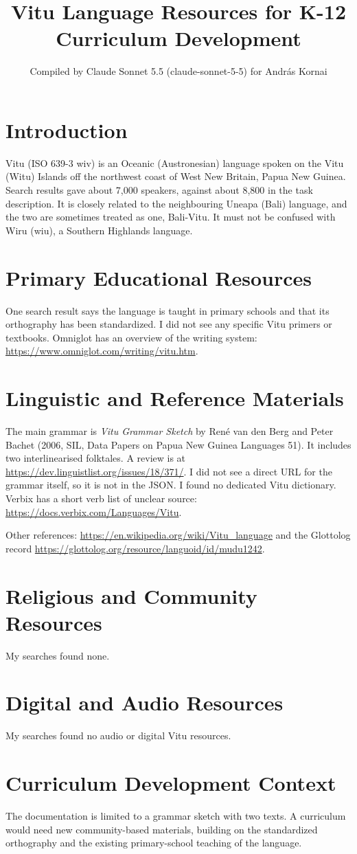 \documentclass[12pt]{article}
\title{Vitu Language Resources for K-12 Curriculum Development}
\author{Compiled by Claude Sonnet 5.5 (claude-sonnet-5-5) for Andr\'as Kornai}
\date{}
\begin{document}
\maketitle

\section{Introduction}
Vitu (ISO 639-3 wiv) is an Oceanic (Austronesian) language spoken on the Vitu (Witu) Islands off the northwest coast of West New Britain, Papua New Guinea. Search results gave about 7,000 speakers, against about 8,800 in the task description. It is closely related to the neighbouring Uneapa (Bali) language, and the two are sometimes treated as one, Bali-Vitu. It must not be confused with Wiru (wiu), a Southern Highlands language.

\section{Primary Educational Resources}
One search result says the language is taught in primary schools and that its orthography has been standardized. I did not see any specific Vitu primers or textbooks. Omniglot has an overview of the writing system: \url{https://www.omniglot.com/writing/vitu.htm}.

\section{Linguistic and Reference Materials}
The main grammar is \emph{Vitu Grammar Sketch} by Ren\'e van den Berg and Peter Bachet (2006, SIL, Data Papers on Papua New Guinea Languages 51). It includes two interlinearised folktales. A review is at \url{https://dev.linguistlist.org/issues/18/371/}. I did not see a direct URL for the grammar itself, so it is not in the JSON. I found no dedicated Vitu dictionary. Verbix has a short verb list of unclear source: \url{https://docs.verbix.com/Languages/Vitu}.

Other references: \url{https://en.wikipedia.org/wiki/Vitu_language} and the Glottolog record \url{https://glottolog.org/resource/languoid/id/mudu1242}.

\section{Religious and Community Resources}
My searches found none.

\section{Digital and Audio Resources}
My searches found no audio or digital Vitu resources.

\section{Curriculum Development Context}
The documentation is limited to a grammar sketch with two texts. A curriculum would need new community-based materials, building on the standardized orthography and the existing primary-school teaching of the language.
\end{document}
